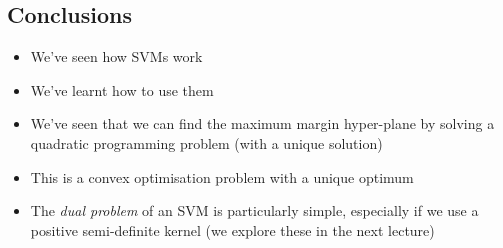 
\begin{slide}
\section{Conclusions}

\begin{PauseHighLight}
  \begin{itemize}
  \item We've seen how SVMs work\pause
  \item We've learnt how to use them\pause
  \item We've seen that we can find the maximum margin hyper-plane by
    solving a quadratic programming problem (with a unique
    solution)\pause
  \item This is a convex optimisation problem with a unique
    optimum\pause
  \item The \emph{dual problem} of an SVM is particularly simple,
    especially if we use a positive semi-definite kernel\pause{} (we
    explore these in the next lecture)\pauseb
  \end{itemize}
\end{PauseHighLight}


\end{slide}



